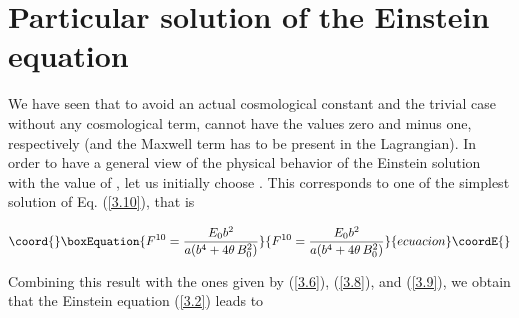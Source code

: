 \documentclass[a4paper,twocolumn,prd,superscriptaddress,nofootinbib,showpacs]
{revtex4}
\begin{document}
\section{Particular solution of the Einstein equation}
\renewcommand{\theequation}{4.\arabic{equation}}
\setcounter{equation}{0}

\medskip
We have seen that to avoid an actual cosmological constant and the
trivial case without any cosmological term, \coordHE{} cannot have the values
zero and minus one, respectively (and the Maxwell term has to be
present in the Lagrangian). In order to have a general view of the
physical behavior of the Einstein solution with the value of \coordHE{}, let
us initially choose \coordHE{}. This corresponds to one of the simplest
solution of Eq. (\ref{3.10}), that is

\begin{equation}\coord{}\boxEquation{
F^{10}=\frac{E_0b^2}{a(b^4+4\theta\,B_0^2)}
\label{4.1}
}{
F^{10}=\frac{E_0b^2}{a(b^4+4\theta\,B_0^2)}
}{ecuacion}\coordE{}\end{equation}

\noindent
Combining this result with the ones given by (\ref{3.6}), (\ref{3.8}),
and (\ref{3.9}), we obtain that the Einstein equation (\ref{3.2})
leads to
\end{document}
